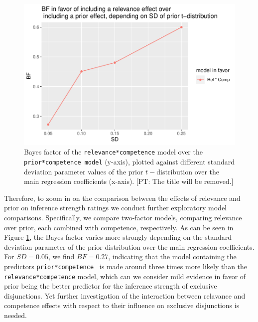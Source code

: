 \documentclass{sp}
\newcommand{\pt}[1]{\textcolor{Cerulean}{[PT: #1]}}
\begin{document}
\begin{figure}[h]
	\begin{center}
		\includegraphics[width=\linewidth]{images/BF_vs_SD_rel-comp_pri-comp.pdf}
	\end{center}
	\vspace{-0.3cm}
	\caption{Bayes factor of the \texttt{relevance*competence} model over the \texttt{prior*competence model} (y-axis), plotted against different standard deviation parameter values of the prior $t-$distribution over the main regression coefficients (x-axis). \pt{The title will be removed.}}
	\label{bf-rel-pri}
\end{figure}

Therefore, to zoom in on the comparison between the effects of relevance and prior on inference strength ratings we conduct further exploratory model comparisons. Specifically, we compare two-factor models, comparing relevance over prior, each combined with competence, respectively. As can be seen in Figure \ref{bf-rel-pri}, the Bayes factor varies more strongly depending on the standard deviation parameter of the prior distribution over the main regression coefficients. For $SD=0.05$, we find $BF=0.27$, indicating that the model containing  the predictors \texttt{prior*competence } is made around three times more likely than the \texttt{relevance*competence} model, which can we consider mild evidence in favor of prior being the better predictor for the inference strength of exclusive disjunctions.
Yet further investigation of the interaction between relavance and competence effects with respect to their influence on exclusive disjunctions is needed.
 
\end{document}
